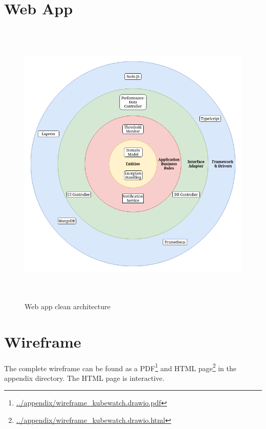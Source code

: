 \section{Web App}
\begin{figure}[H]
  \centering
  \includegraphics[height=14cm]{resources/clean_architecture.png}
  \caption{Web app clean architecture}
  \label{fig:web-app-architecture}
\end{figure}

\section{Wireframe}
The complete wireframe can be found as a PDF\footnote{\url{../appendix/wireframe_kubewatch.drawio.pdf}} and HTML page\footnote{\url{../appendix/wireframe_kubewatch.drawio.html}} in the appendix directory.
The HTML page is interactive.
